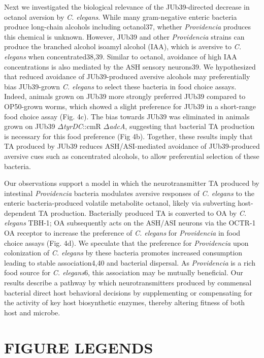 \documentclass[]{article}
\begin{document}
Next we investigated the biological relevance of the JUb39-directed
decrease in octanol aversion by \textit{C. elegans}. While many
gram-negative enteric bacteria produce long-chain alcohols including
octanol37, whether \textit{Providencia} produces this chemical is
unknown. However, JUb39 and other \textit{Providencia} strains can
produce the branched alcohol isoamyl alcohol (IAA), which is aversive to
\textit{C. elegans} when concentrated38,39. Similar to octanol,
avoidance of high IAA concentrations is also mediated by the ASH sensory
neurons39. We hypothesized that reduced avoidance of JUb39-produced
aversive alcohols may preferentially bias JUb39-grown
\textit{C. elegans} to select these bacteria in food choice assays.
Indeed, animals grown on JUb39 more strongly preferred JUb39 compared to
OP50-grown worms, which showed a slight preference for JUb39 in a
short-range food choice assay (Fig. 4c). The bias towards JUb39 was
eliminated in animals grown on JUb39 \(\Delta\)\textit{tyrDC}::cmR
\(\Delta\)\textit{adcA}, suggesting that bacterial TA production is
necessary for this food preference (Fig 4b). Together, these results
imply that TA produced by JUb39 reduces ASH/ASI-mediated avoidance of
JUb39-produced aversive cues such as concentrated alcohols, to allow
preferential selection of these bacteria.

Our observations support a model in which the neurotransmitter TA
produced by intestinal \textit{Providencia} bacteria modulates aversive
responses of \textit{C. elegans} to the enteric bacteria-produced
volatile metabolite octanol, likely via subverting host-dependent TA
production. Bacterially produced TA is converted to OA by
\textit{C. elegans} TBH-1; OA subsequently acts on the ASH/ASI neurons
via the OCTR-1 OA receptor to increase the preference of
\textit{C. elegans} for \textit{Providencia} in food choice assays (Fig.
4d). We speculate that the preference for \textit{Providencia} upon
colonization of \textit{C. elegans} by these bacteria promotes increased
consumption leading to stable association4,40 and bacterial dispersal.
As \textit{Providencia} is a rich food source for \textit{C. elegans}6,
this association may be mutually beneficial. Our results describe a
pathway by which neurotransmitters produced by commensal bacterial
direct host behavioral decisions by supplementing or compensating for
the activity of key host biosynthetic enzymes, thereby altering fitness
of both host and microbe.

\hypertarget{figure-legends}{%
\section{FIGURE LEGENDS}\label{figure-legends}}
\end{document}
